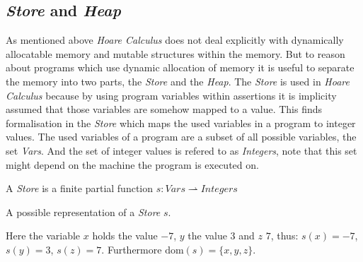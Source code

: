 	\subsection{\emph{Store} and \emph{Heap}}
	As mentioned above \emph{Hoare Calculus} does not deal explicitly with
	dynamically allocatable memory and mutable structures within the memory.
	But to reason about programs which use dynamic allocation of memory it is
	useful to separate the memory into two parts, the \emph{Store} and the
	\emph{Heap}. The \emph{Store} is used in \emph{Hoare Calculus} because by
	using program variables within assertions it is implicity assumed that those
	variables are somehow mapped to a value.
	This finds formalisation in the \emph{Store} which maps the
	used variables in a program to integer values. The used variables of
	a program are a subset of all possible variables, the set \emph{Vars}.
	And the set of integer values is refered to as \emph{Integers}, note
	that this set might depend on the machine the program is executed on.
	
	\begin{mydef}
		A \emph{Store} is a finite partial function
		$s:\textit{Vars}\rightharpoonup \textit{Integers}$
	\end{mydef}
	\begin{myexp}
	A possible representation of a \emph{Store} $s$.\\
	\begin{center}
	\end{center}
	Here the variable
	$x$ holds the value $-7$, $y$ the value $3$ and $z$ $7$, thus:
	$s(x) = -7$, $s(y) = 3$, $s(z) = 7$.
	Furthermore $\text{dom}(s) = \{x,y,z\}$.
	\end{myexp}

